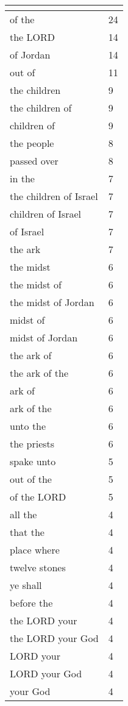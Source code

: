 \begin{center}
\begin{longtable}{|p{3.0in}|p{0.5in}|}
\hline \multicolumn{2}{c}{{ }} \\ \hline
\endfoot 
of the & 24\\ \hline 
the LORD & 14\\ \hline 
of Jordan & 14\\ \hline 
out of & 11\\ \hline 
the children & 9\\ \hline 
the children of & 9\\ \hline 
children of & 9\\ \hline 
the people & 8\\ \hline 
passed over & 8\\ \hline 
in the & 7\\ \hline 
the children of Israel & 7\\ \hline 
children of Israel & 7\\ \hline 
of Israel & 7\\ \hline 
the ark & 7\\ \hline 
the midst & 6\\ \hline 
the midst of & 6\\ \hline 
the midst of Jordan & 6\\ \hline 
midst of & 6\\ \hline 
midst of Jordan & 6\\ \hline 
the ark of & 6\\ \hline 
the ark of the & 6\\ \hline 
ark of & 6\\ \hline 
ark of the & 6\\ \hline 
unto the & 6\\ \hline 
the priests & 6\\ \hline 
spake unto & 5\\ \hline 
out of the & 5\\ \hline 
of the LORD & 5\\ \hline 
all the & 4\\ \hline 
that the & 4\\ \hline 
place where & 4\\ \hline 
twelve stones & 4\\ \hline 
ye shall & 4\\ \hline 
before the & 4\\ \hline 
the LORD your & 4\\ \hline 
the LORD your God & 4\\ \hline 
LORD your & 4\\ \hline 
LORD your God & 4\\ \hline 
your God & 4\\ \hline 

\end{longtable}
\end{center}
